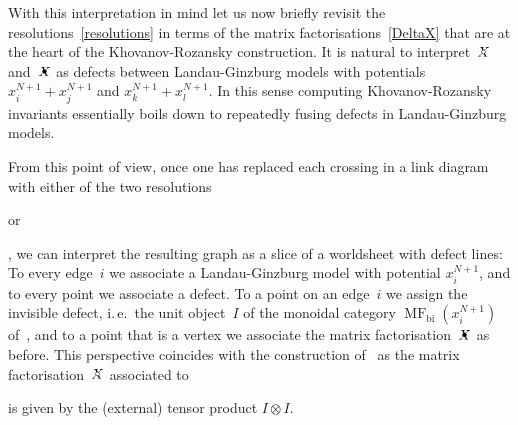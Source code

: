 \documentclass{compositio}
\theoremstyle{definition}
\numberwithin{equation}{section}
\begin{document}
With this interpretation in mind let us now briefly revisit the resolutions~\eqref{resolutions} in terms of the matrix factorisations~\eqref{DeltaX} that are at the heart of the Khovanov-Rozansky construction. It is natural to interpret~$\Xcirc$ and~$\Xbul$ as defects between Landau-Ginzburg models with potentials $x^{N+1}_{i}+x^{N+1}_{j}$ and $x^{N+1}_{k}+x^{N+1}_{l}$. In this sense computing Khovanov-Rozansky invariants essentially boils down to repeatedly fusing defects in Landau-Ginzburg models. 

From this point of view, once one has replaced each crossing in a link diagram with either of the two resolutions 
\begin{minipage}{0.36cm}
\end{minipage}
 or 
 \begin{minipage}{0.36cm}
\end{minipage}
, we can interpret the resulting graph as a slice of a worldsheet with defect lines: To every edge~$i$ we associate a Landau-Ginzburg model with potential $x_{i}^{N+1}$, and to every point we associate a defect. To a point on an edge~$i$ we assign the invisible defect, i.\,e.~the unit object~$I$ of the monoidal category $\operatorname{MF}_{\text{bi}}(x_{i}^{N+1})$ of~\cite{cr0909.4381}, and to a point that is a vertex we associate the matrix factorisation~$\Xbul$ as before. This perspective coincides with the construction of~\cite{kr0401268} as the matrix factorisation~$\Xcirc$ associated to 
\begin{minipage}{0.3cm}
\end{minipage}
 is given by the (external) tensor product $I\otimes I$. 
\end{document}
